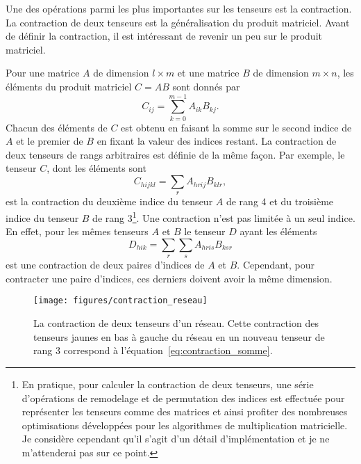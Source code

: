 Une des opérations parmi les plus importantes sur les tenseurs est la contraction.
La contraction de deux tenseurs est la généralisation du produit matriciel.
Avant de définir la contraction,
il est intéressant de revenir un peu sur le produit matriciel.

Pour une matrice $A$ de dimension $l \times m$ et une matrice $B$ de dimension $m \times n$,
les éléments du produit matriciel $C = AB$ sont donnés par
\begin{equation}
  C_{ij} = \sum_{k=0}^{m - 1} A_{ik} B_{kj}.
\end{equation}
Chacun des éléments de $C$ est obtenu en faisant 
la somme sur le second indice de $A$ et le premier de $B$ 
en fixant la valeur des indices restant.
La contraction de deux tenseurs de rangs arbitraires est définie 
de la même façon.
Par exemple, 
le tenseur $C$, dont les éléments sont
\begin{equation}
  C_{hijkl} = \sum_{r} A_{hrij} B_{klr},
\end{equation}
est la contraction du deuxième indice du tenseur $A$ de rang 4
et du troisième indice du tenseur $B$ de rang 3\footnote{
En pratique, pour calculer la contraction de deux tenseurs, 
une série d'opérations de remodelage et de permutation des indices 
est effectuée pour représenter les tenseurs comme des matrices et 
ainsi profiter des nombreuses optimisations développées pour les algorithmes
de multiplication matricielle.
Je considère cependant qu'il s'agit d'un détail d'implémentation 
et je ne m'attenderai pas sur ce point.
}.
Une contraction n'est pas limitée à un seul indice.
En effet,
pour les mêmes tenseurs $A$ et $B$ le tenseur $D$ ayant les éléments
\begin{equation}
  D_{hik} = \sum_{r} \sum_{s} A_{hris} B_{ksr}
  \label{eq:contraction_somme}
\end{equation}
est une contraction de deux paires d'indices de $A$ et $B$.
Cependant,
pour contracter une paire d'indices,
ces derniers doivent avoir la même dimension. 

\begin{figure}[t]
  \begin{center}
    \texttt{[image: figures/contraction\_reseau]}
  \end{center}
  \caption[Contraction de deux tenseurs]{
    La contraction de deux tenseurs d'un réseau.
    Cette contraction des tenseurs jaunes en bas à gauche du réseau
    en un nouveau tenseur de rang 3 correspond à l'équation~\eqref{eq:contraction_somme}.
  }
  \label{fig:contraction_reseau}
\end{figure}

